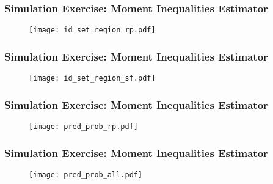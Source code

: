 \begin{frame}
\frametitle{Simulation Exercise: Moment Inequalities Estimator}

\begin{figure}[h!]
\centering \texttt{[image: id\_set\_region\_rp.pdf]}
\end{figure}

\end{frame}

\begin{frame}
\frametitle{Simulation Exercise: Moment Inequalities Estimator}

\begin{figure}[h!]
\centering \texttt{[image: id\_set\_region\_sf.pdf]}
\end{figure}

\end{frame}
\begin{frame}
\frametitle{Simulation Exercise: Moment Inequalities Estimator}

\begin{figure}[h!]
\centering \texttt{[image: pred\_prob\_rp.pdf]}
\end{figure}

\end{frame}

\begin{frame}
\frametitle{Simulation Exercise: Moment Inequalities Estimator}

\begin{figure}[h!]
\centering \texttt{[image: pred\_prob\_all.pdf]}
\end{figure}

\end{frame}


